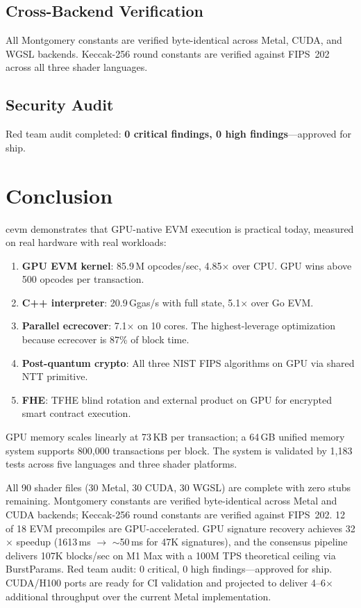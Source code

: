 \documentclass[11pt]{article}
\begin{document}
\subsection{Cross-Backend Verification}

All Montgomery constants are verified byte-identical across Metal, CUDA, and WGSL backends.
Keccak-256 round constants are verified against FIPS~202 across all three shader languages.

\subsection{Security Audit}

Red team audit completed: \textbf{0 critical findings, 0 high findings}---approved for ship.

\section{Conclusion}
\label{sec:conclusion}

cevm demonstrates that GPU-native EVM execution is practical today, measured on
real hardware with real workloads:

\begin{enumerate}
\item \textbf{GPU EVM kernel}: 85.9\,M opcodes/sec, 4.85$\times$ over CPU. GPU wins
      above 500 opcodes per transaction.
\item \textbf{C++ interpreter}: 20.9\,Ggas/s with full state, 5.1$\times$ over Go EVM.
\item \textbf{Parallel ecrecover}: 7.1$\times$ on 10 cores. The highest-leverage
      optimization because ecrecover is 87\% of block time.
\item \textbf{Post-quantum crypto}: All three NIST FIPS algorithms on GPU via shared
      NTT primitive.
\item \textbf{FHE}: TFHE blind rotation and external product on GPU for encrypted
      smart contract execution.
\end{enumerate}

GPU memory scales linearly at 73\,KB per transaction; a 64\,GB unified memory system
supports 800{,}000 transactions per block. The system is validated by 1{,}183 tests
across five languages and three shader platforms.

All 90 shader files (30 Metal, 30 CUDA, 30 WGSL) are complete with zero stubs remaining.
Montgomery constants are verified byte-identical across Metal and CUDA backends; Keccak-256
round constants are verified against FIPS~202. 12 of 18 EVM precompiles are GPU-accelerated.
GPU signature recovery achieves 32$\times$ speedup (1613\,ms $\to$ $\sim$50\,ms for 47K
signatures), and the consensus pipeline delivers 107K blocks/sec on M1 Max with a 100M TPS
theoretical ceiling via BurstParams. Red team audit: 0 critical, 0 high findings---approved
for ship. CUDA/H100 ports are ready for CI validation and projected to deliver 4--6$\times$
additional throughput over the current Metal implementation.
\end{document}
